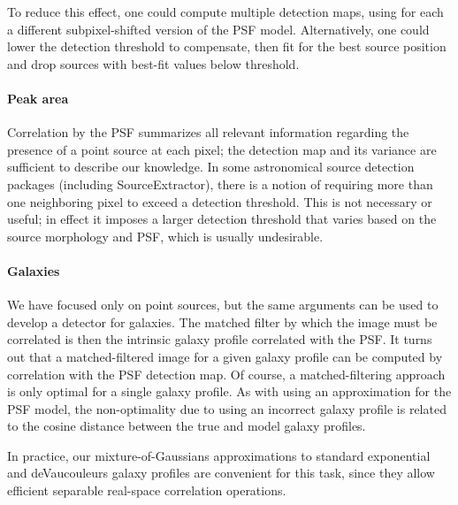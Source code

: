 \documentclass[11pt,letterpaper,linenumbers]{aastex63}
\begin{document}
To reduce this effect, one could compute multiple detection maps,
using for each a different subpixel-shifted version of the PSF model.
Alternatively, one could lower the detection threshold to compensate,
then fit for the best source position and drop sources with best-fit
values below threshold.


\paragraph{Peak area}  Correlation by the PSF summarizes
all relevant information regarding the presence of a point source at each
pixel; the detection map and its variance are sufficient to describe
our knowledge.  In some astronomical source detection packages
(including SourceExtractor), there is a notion of requiring more than
one neighboring pixel to exceed a detection threshold.  This is not
necessary or useful; in effect it imposes a larger detection threshold
that varies based on the source morphology and PSF, which is
usually undesirable.



\paragraph{Galaxies}
We have focused only on point sources, but the same arguments can be
used to develop a detector for galaxies.  The matched filter by which
the image must be correlated is then the intrinsic galaxy profile
correlated with the PSF.  It turns out \citep{zackay1} that a
matched-filtered image for a given galaxy profile can be computed by
correlation with the PSF detection map.
Of course, a matched-filtering approach is only optimal
for a single galaxy profile.  As with using an approximation for the
PSF model, the non-optimality due to using an incorrect galaxy profile
is related to the cosine distance between the true and model galaxy
profiles.

In practice, our mixture-of-Gaussians approximations to standard
exponential and deVaucouleurs galaxy profiles \citep{gaussgals} are
convenient for this task, since they allow efficient separable
real-space correlation operations.
\end{document}

